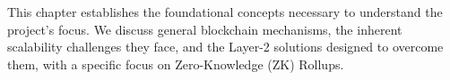 This chapter establishes the foundational concepts necessary to understand the project's focus. We discuss general blockchain mechanisms, the inherent scalability challenges they face, and the Layer-2 solutions designed to overcome them, with a specific focus on Zero-Knowledge (ZK) Rollups.